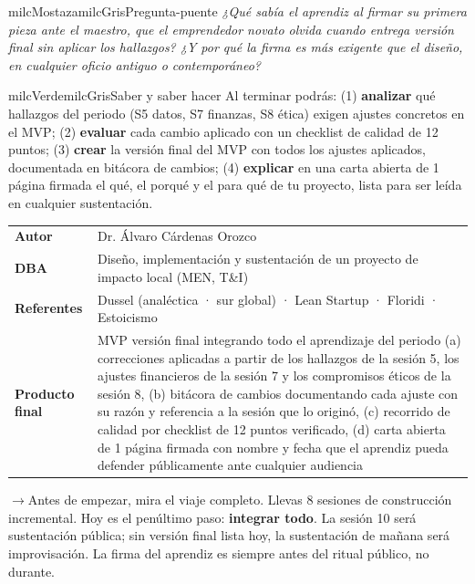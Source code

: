 \documentclass[11pt,letterpaper]{article}
\newcommand{\puente}[1]{%
  \begin{puentebox}%
    \textcolor{milcGradeDark}{$\rightarrow$}\hspace{2mm}#1%
  \end{puentebox}%
}
\begin{document}
\begin{softbox}{milcMostaza}{milcGris}{Pregunta-puente}
\textit{¿Qué sabía el aprendiz al firmar su primera pieza ante el maestro, que el emprendedor novato olvida cuando entrega versión final sin aplicar los hallazgos? ¿Y por qué la firma es más exigente que el diseño, en cualquier oficio antiguo o contemporáneo?}
\end{softbox}

\begin{softbox}{milcVerde}{milcGris}{Saber y saber hacer}
Al terminar podrás: (1) \textbf{analizar} qué hallazgos del periodo (S5 datos, S7 finanzas, S8 ética) exigen ajustes concretos en el MVP; (2) \textbf{evaluar} cada cambio aplicado con un checklist de calidad de 12 puntos; (3) \textbf{crear} la versión final del MVP con todos los ajustes aplicados, documentada en bitácora de cambios; (4) \textbf{explicar} en una carta abierta de 1 página firmada el qué, el porqué y el para qué de tu proyecto, lista para ser leída en cualquier sustentación.
\end{softbox}



\small
\begin{tabularx}{\textwidth}{>{\bfseries}p{3.0cm}Y}
Autor & Dr. Álvaro Cárdenas Orozco\\
DBA & Diseño, implementación y sustentación de un proyecto de impacto local (MEN, T\&I)\\
Referentes & Dussel (analéctica · sur global) · Lean Startup · Floridi · Estoicismo\\
Producto final & MVP versión final integrando todo el aprendizaje del periodo (a) correcciones aplicadas a partir de los hallazgos de la sesión 5, los ajustes financieros de la sesión 7 y los compromisos éticos de la sesión 8, (b) bitácora de cambios documentando cada ajuste con su razón y referencia a la sesión que lo originó, (c) recorrido de calidad por checklist de 12 puntos verificado, (d) carta abierta de 1 página firmada con nombre y fecha que el aprendiz pueda defender públicamente ante cualquier audiencia\\
\end{tabularx}
\normalsize

\puente{Antes de empezar, mira el viaje completo. Llevas 8 sesiones de construcción incremental. Hoy es el penúltimo paso: \textbf{integrar todo}. La sesión 10 será sustentación pública; sin versión final lista hoy, la sustentación de mañana será improvisación. La firma del aprendiz es siempre antes del ritual público, no durante.}
\end{document}
